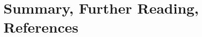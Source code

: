 \section{Summary, Further Reading, References}
\label{sec:mlp_backprop:summary_further_reading_references}

